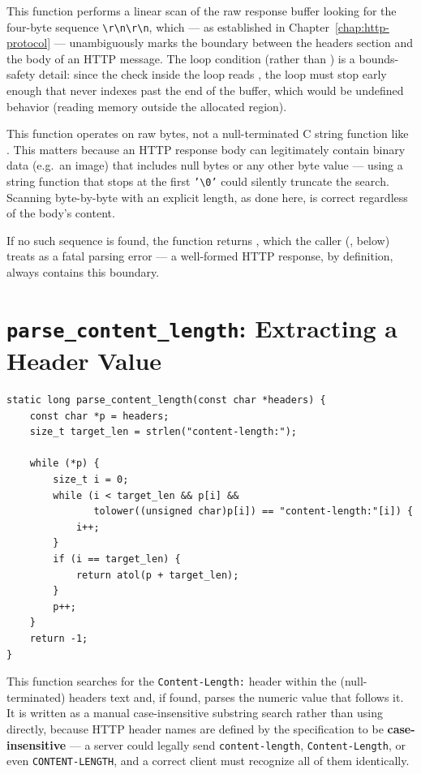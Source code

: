 This function performs a linear scan of the raw response buffer looking for the four-byte sequence \texttt{\textbackslash r\textbackslash n\textbackslash r\textbackslash n}, which --- as established in Chapter~\ref{chap:http-protocol} --- unambiguously marks the boundary between the headers section and the body of an HTTP message. The loop condition  (rather than ) is a bounds-safety detail: since the check inside the loop reads , the loop must stop early enough that  never indexes past the end of the buffer, which would be undefined behavior (reading memory outside the allocated region).

\begin{note}
This function operates on raw bytes, not a null-terminated C string function like . This matters because an HTTP response body can legitimately contain binary data (e.g.\ an image) that includes null bytes or any other byte value --- using a string function that stops at the first \texttt{'\textbackslash 0'} could silently truncate the search. Scanning byte-by-byte with an explicit length, as done here, is correct regardless of the body's content.
\end{note}

If no such sequence is found, the function returns , which the caller (, below) treats as a fatal parsing error --- a well-formed HTTP response, by definition, always contains this boundary.

\section{\texttt{parse\_content\_length}: Extracting a Header Value}

\begin{lstlisting}[style=cstyle]
static long parse_content_length(const char *headers) {
    const char *p = headers;
    size_t target_len = strlen("content-length:");

    while (*p) {
        size_t i = 0;
        while (i < target_len && p[i] &&
               tolower((unsigned char)p[i]) == "content-length:"[i]) {
            i++;
        }
        if (i == target_len) {
            return atol(p + target_len);
        }
        p++;
    }
    return -1;
}
\end{lstlisting}

This function searches for the \texttt{Content-Length:} header within the (null-terminated) headers text and, if found, parses the numeric value that follows it. It is written as a manual case-insensitive substring search rather than using  directly, because HTTP header names are defined by the specification to be \textbf{case-insensitive} --- a server could legally send \texttt{content-length}, \texttt{Content-Length}, or even \texttt{CONTENT-LENGTH}, and a correct client must recognize all of them identically.

